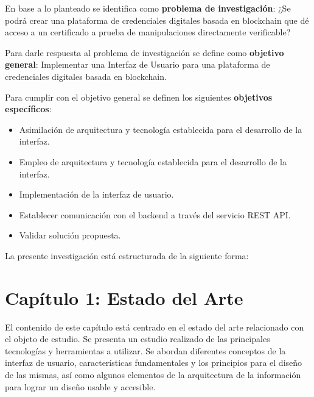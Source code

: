 En base a lo planteado se identifica como \textbf{problema de investigaci\'on}: ¿Se podr\'a crear una plataforma de credenciales digitales basada en blockchain que d\'e acceso a un certificado a prueba de manipulaciones directamente verificable?\par

Para darle respuesta al problema de investigaci\'on se define como \textbf{objetivo general}: Implementar una Interfaz de Usuario para una plataforma de credenciales digitales basada en blockchain.

Para cumplir con el objetivo general se definen los siguientes \textbf{objetivos espec\'ificos}:
\begin{itemize}
\item Asimilaci\'on de arquitectura y tecnolog\'ia establecida para el desarrollo de la interfaz.
\item Empleo de arquitectura y tecnolog\'ia establecida para el desarrollo de la interfaz.
\item Implementaci\'on de la interfaz de usuario.
\item Establecer comunicaci\'on con el backend  a trav\'es del servicio REST API.
\item Validar soluci\'on propuesta.
\end{itemize}

La presente investigación está estructurada de la siguiente forma:

\section*{Capítulo 1: Estado del Arte}

El contenido de este capítulo está centrado en el estado del arte relacionado con el objeto de estudio. Se presenta un estudio realizado de las principales tecnologías y herramientas a utilizar. Se abordan diferentes conceptos de la interfaz de usuario, características fundamentales y los principios para el diseño de las mismas, así como algunos elementos de la arquitectura de la información para lograr un diseño usable y accesible.

